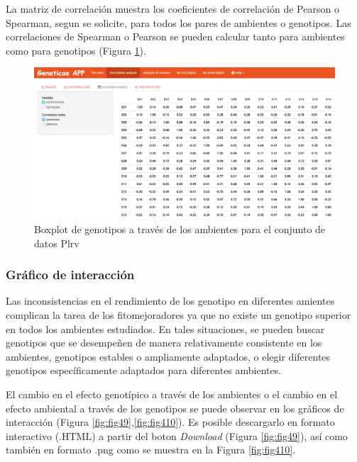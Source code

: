 La matriz de correlación muestra los coeficientes de correlación de Pearson o Spearman, segun se solicite, para todos los pares de ambientes o genotipos. Las correlaciones de Spearman o Pearson se pueden calcular tanto para ambientes como para genotipos (Figura \ref{fig:fig47}).


\begin{figure}[H]
	\begin{center}
		\includegraphics[width=14cm]{./Graficos/corr_matrix.png}
	\end{center}
	\caption{Boxplot de genotipos a través de los ambientes para el conjunto de datos Plrv}
	\label{fig:fig47}
\end{figure}



\subsubsection{Gráfico de interacción}

Las inconsistencias en el rendimiento de los genotipo en diferentes amientes complican la tarea de los fitomejoradores ya que no existe un genotipo superior en todos los ambientes estudiados. En tales situaciones, se pueden buscar genotipos que se desempeñen de manera relativamente consistente en los ambientes, genotipos estables o ampliamente adaptados, o elegir diferentes genotipos específicamente adaptados para diferentes ambientes. 

El cambio en el efecto genotípico a través de los ambientes o el cambio en el efecto ambiental a través de los genotipos se puede observar en los gráficos de interacción (Figura \ref{fig:fig49},\ref{fig:fig410}). Es posible descargarlo en formato interactivo (.HTML) a partir del boton \emph{Download} (Figura \ref{fig:fig49}), así como también en formato .png como se muestra en la Figura \ref{fig:fig410}.


